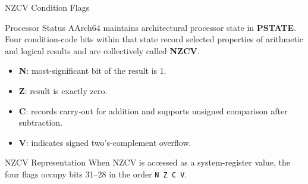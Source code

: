 \documentclass[aspectratio=169,11pt,t]{beamer}
\newcommand{\key}[1]{\textbf{#1}}
\newcommand{\code}[1]{\texttt{#1}}
\begin{document}
\begin{frame}{NZCV Condition Flags}
\vspace{-0.25cm}
\begin{block}{Processor Status}
AArch64 maintains architectural processor state in \key{PSTATE}. Four condition-code bits within that state record selected properties of arithmetic and logical results and are collectively called \key{NZCV}.
\end{block}
\begin{center}
\end{center}
\vspace{-0.15cm}
\begin{itemize}
\item \key{N}: most-significant bit of the result is 1.
\item \key{Z}: result is exactly zero.
\item \key{C}: records carry-out for addition and supports unsigned comparison after subtraction.
\item \key{V}: indicates signed two's-complement overflow.
\end{itemize}
\vspace{0.05cm}
\begin{block}{NZCV Representation}
When NZCV is accessed as a system-register value, the four flags occupy bits 31--28 in the order \code{N Z C V}.
\end{block}
\end{frame}










\end{document}
